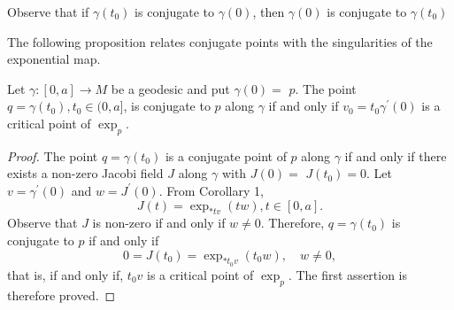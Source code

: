 \documentclass{ctexart}
\begin{document}
Observe that if $\gamma\left(t_0\right)$ is conjugate to $\gamma(0)$, then $\gamma(0)$ is conjugate to $\gamma\left(t_0\right)$

The following proposition relates conjugate points with the singularities of the exponential map. 
\begin{proposition}
  Let $\gamma:[0, a] \rightarrow M$ be a geodesic and put $\gamma(0)=$ $p$. The point $q=\gamma\left(t_0\right), t_0 \in(0, a]$, is conjugate to $p$ along $\gamma$ if 
  and only if $v_0=t_0 \gamma^{\prime}(0)$ is a critical point of $\exp _p$. 
\end{proposition}
\begin{proof}[Proof]
  The point $q=\gamma\left(t_0\right)$ is a conjugate point of $p$ along $\gamma$ if and only if there exists a non-zero Jacobi field $J$ along $\gamma$ 
  with $J(0)=$ $J\left(t_0\right)=0$. Let $v=\gamma^{\prime}(0)$ and $w=J^{\prime}(0)$. From Corollary 1, 
  $$
  J(t)=\exp_{*t v}(t w), t \in[0, a].
  $$
  Observe that $J$ is non-zero if and only if $w \neq 0$. Therefore, $q=\gamma\left(t_0\right)$ is conjugate to $p$ if and only if
  $$
  0=J\left(t_0\right)=\exp_{*t_0 v}\left(t_0 w\right), \quad w \neq 0,
  $$
  that is, if and only if, $t_0 v$ is a critical point of $\exp _p$. The first assertion is therefore proved.

\end{proof}
\end{document}

